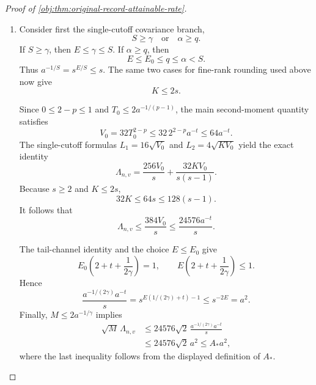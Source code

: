 \begin{proof}[Proof of \cref{obj:thm:original-record-attainable-rate}]
\begin{enumerate}
Using \(a_j=40R_{j-1}^{-\alpha}\), \(R_j=2R_{j-1}\), and \(2^\alpha\le2\), we obtain
\[
\begin{aligned}
a_jT_j^{1-p}
&\le40aR_{j-1}^{-\alpha}
 +40a\,2^\alpha(R_j/K)^{\lambda_0}\\
&\le80a\left\{R_{j-1}^{-\alpha}+(R_j/K)^{\lambda_0}\right\}.
\end{aligned}
\]
Summation consequently gives
\[
\sum_{j=1}^{L}a_jT_j^{1-p}
\le80a\{A(\alpha)+A(\lambda_0)\}.
\]
Substituting into the multilevel bias ledger proves
\[
\begin{aligned}
B
&=400K^{-S}+20T_0^{1-p}
  +10\sum_{j=1}^{L}a_jT_j^{1-p}\\
&\le\left[420+800\{A(\alpha)+A(\lambda_0)\}\right]a
=B_*a.
\end{aligned}
\]
Thus this bias estimate holds in both score branches.

\item Consider first the single-cutoff covariance branch,
\[
S\ge\gamma\quad\text{or}\quad\alpha\ge q.
\]
If \(S\ge\gamma\), then \(E\le\gamma\le S\). If \(\alpha\ge q\), then
\[
E\le E_0\le q\le\alpha<S.
\]
Thus \(a^{-1/S}=s^{E/S}\le s\). The same two cases for fine-rank rounding used above now give
\[
K\le2s.
\]

Since \(0\le2-p\le1\) and \(T_0\le2a^{-1/(p-1)}\), the main second-moment quantity satisfies
\[
V_0=32T_0^{2-p}
\le32\,2^{2-p}a^{-t}
\le64a^{-t}.
\]
The single-cutoff formulas \(L_1=16\sqrt{V_0}\) and \(L_2=4\sqrt{KV_0}\) yield the exact identity
\[
\Lambda_{n,v}
=\frac{256V_0}{s}+\frac{32KV_0}{s(s-1)}.
\]
Because \(s\ge2\) and \(K\le2s\),
\[
32K\le64s\le128(s-1).
\]
It follows that
\[
\Lambda_{n,v}
\le\frac{384V_0}{s}
\le\frac{24576a^{-t}}{s}.
\]

The tail-channel identity and the choice \(E\le E_0\) give
\[
E_0\left(2+t+\frac{1}{2\gamma}\right)=1,
\qquad
E\left(2+t+\frac{1}{2\gamma}\right)\le1.
\]
Hence
\[
\frac{a^{-1/(2\gamma)}a^{-t}}{s}
=s^{E(1/(2\gamma)+t)-1}
\le s^{-2E}=a^2.
\]
Finally, \(M\le2a^{-1/\gamma}\) implies
\[
\begin{aligned}
\sqrt M\,\Lambda_{n,v}
&\le24576\sqrt2\,
 \frac{a^{-1/(2\gamma)}a^{-t}}{s}\\
&\le24576\sqrt2\,a^2
\le A_*a^2,
\end{aligned}
\]
where the last inequality follows from the displayed definition of \(A_*\).


\end{enumerate}
\end{proof}
